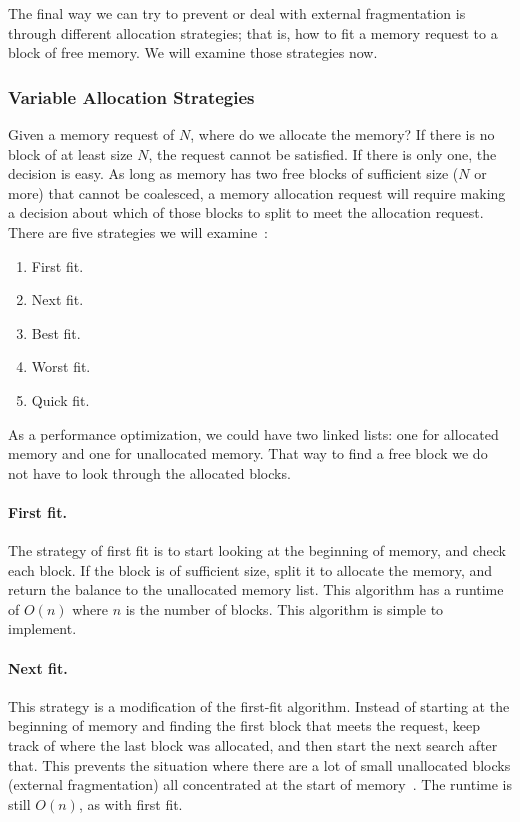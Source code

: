 The final way we can try to prevent or deal with external fragmentation is through different allocation strategies; that is, how to fit a memory request to a block of free memory. We will examine those strategies now.

\subsubsection*{Variable Allocation Strategies}

Given a memory request of $N$, where do we allocate the memory? If there is no block of at least size $N$, the request cannot be satisfied. If there is only one, the decision is easy. As long as memory has two free blocks of sufficient size ($N$ or more) that cannot be coalesced, a memory allocation request will require making a decision about which of those blocks to split to meet the allocation request. There are five strategies we will examine~\cite{mte241}:

\begin{enumerate}
	\item First fit.
	\item Next fit.
	\item Best fit.
	\item Worst fit.
	\item Quick fit.
\end{enumerate}

As a performance optimization, we could have two linked lists: one for allocated memory and one for unallocated memory. That way to find a free block we do not have to look through the allocated blocks.

\paragraph{First fit.} The strategy of first fit is to start looking at the beginning of memory, and check each block. If the block is of sufficient size, split it to allocate the memory, and return the balance to the unallocated memory list. This algorithm has a runtime of $O(n)$ where $n$ is the number of blocks. This algorithm is simple to implement. 

\paragraph{Next fit.} This strategy is a modification of the first-fit algorithm. Instead of starting at the beginning of memory and finding the first block that meets the request, keep track of where the last block was allocated, and then start the next search after that. This prevents the situation where there are a lot of small unallocated blocks (external fragmentation) all concentrated at the start of memory~\cite{mte241}. The runtime is still $O(n)$, as with first fit.

